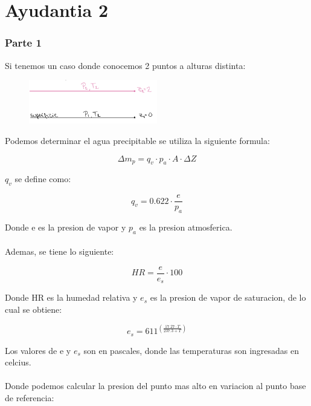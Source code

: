 \part{Ayudantia 2}

\section{Parte 1}

Si tenemos un caso donde conocemos 2 puntos a alturas distinta:

\begin{figure}[H]
    \centering
    \includegraphics[width=0.5\textwidth]{imagenes/ayud_2_1.png}
    \label{fig:altura}
\end{figure}

Podemos determinar el agua precipitable se utiliza la siguiente formula:

\begin{equation}
    \Delta m_p = q_v \cdot p_a \cdot A \cdot \Delta Z
\end{equation}

$q_v$ se define como:

\begin{equation}
    q_v = 0.622 \cdot \frac{e}{p_a}
\end{equation}

Donde e es la presion de vapor y $p_a$ es la presion atmosferica.
\\ \\ 
Ademas, se tiene lo siguiente:

\begin{equation}
    HR = \frac{e}{e_s} \cdot 100
\end{equation}

Donde HR es la humedad relativa y $e_s$ es la presion de vapor de saturacion, de lo cual se obtiene:

\begin{equation}
    e_s = 611^(\frac{17.27 \cdot T}{237.3 + T})
\end{equation}

Los valores de e y $e_s$ son en pascales, donde las temperaturas son ingresadas en celcius.
\\ \\
Donde podemos calcular la presion del punto mas alto en variacion al punto base de referencia:


